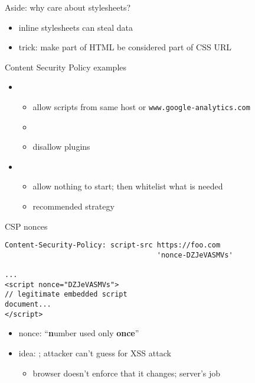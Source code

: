\begin{frame}{Aside: why care about stylesheets?}
    \begin{itemize}
    \item inline stylesheets can steal data
    \item trick: make part of HTML be considered part of CSS URL
    \end{itemize}
\end{frame}

\begin{frame}{Content Security Policy examples}
    \begin{itemize}
        \item {}
        \begin{itemize}
            \item allow scripts from same host or \texttt{www.google-analytics.com}
            \item {}
            \item disallow plugins
        \end{itemize}
    \item {}
        \begin{itemize}
            \item allow nothing to start; then whitelist what is needed
            \item recommended strategy
        \end{itemize}
    \end{itemize}
\end{frame}

\begin{frame}[fragile,label=CSPNonces]{CSP nonces}
\begin{verbatim}
Content-Security-Policy: script-src https://foo.com
                                    'nonce-DZJeVASMVs'

...
<script nonce="DZJeVASMVs">
// legitimate embedded script
document...
</script>
\end{verbatim}
    \begin{itemize}
    \item nonce: ``\textbf{n}umber used only \textbf{once}''
    \item idea: ; attacker can't guess for XSS attack
        \begin{itemize}
        \item browser doesn't enforce that it changes; server's job
        \end{itemize}
    \end{itemize}
\end{frame}

